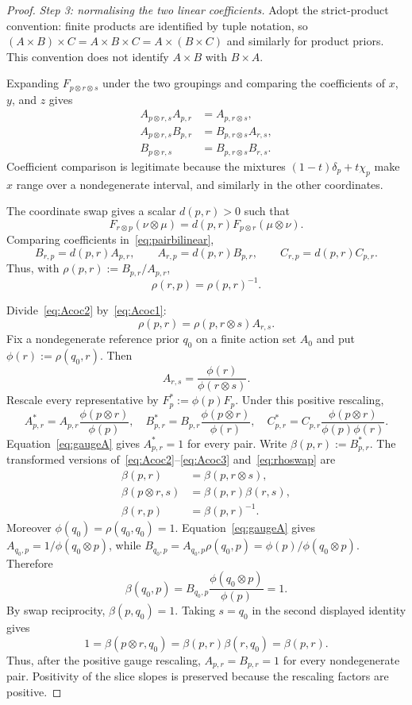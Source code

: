 \documentclass[11pt,a4paper]{article}
\theoremstyle{definition}
\newcommand{\1}{\mathbf 1}
\begin{document}
\begin{proof}
\emph{Step 3: normalising the two linear coefficients.}
Adopt the strict-product convention: finite products are identified by tuple notation, so
$(A\times B)\times C=A\times B\times C=A\times(B\times C)$ and similarly for product priors.  This convention does
not identify $A\times B$ with $B\times A$.

Expanding $F_{p\otimes r\otimes s}$ under the two groupings and comparing the coefficients of $x$, $y$, and $z$ gives
\begin{align}
A_{p\otimes r,s}A_{p,r}&=A_{p,r\otimes s}, \tag{C1}\label{eq:Acoc1}\\
A_{p\otimes r,s}B_{p,r}&=B_{p,r\otimes s}A_{r,s}, \tag{C2}\label{eq:Acoc2}\\
B_{p\otimes r,s}&=B_{p,r\otimes s}B_{r,s}. \tag{C3}\label{eq:Acoc3}
\end{align}
Coefficient comparison is legitimate because the mixtures $(1-t)\delta_p+t\chi_p$ make $x$ range over a nondegenerate
interval, and similarly in the other coordinates.

The coordinate swap gives a scalar $d(p,r)>0$ such that
\[
F_{r\otimes p}(\nu\otimes\mu)=d(p,r)F_{p\otimes r}(\mu\otimes\nu).
\]
Comparing coefficients in~\eqref{eq:pairbilinear},
\[
B_{r,p}=d(p,r)A_{p,r},
\qquad
A_{r,p}=d(p,r)B_{p,r},
\qquad
C_{r,p}=d(p,r)C_{p,r}.
\]
Thus, with $\rho(p,r):=B_{p,r}/A_{p,r}$,
\begin{equation}
\rho(r,p)=\rho(p,r)^{-1}.
\tag{SW}\label{eq:rhoswap}
\end{equation}

Divide~\eqref{eq:Acoc2} by~\eqref{eq:Acoc1}:
\[
\rho(p,r)=\rho(p,r\otimes s)A_{r,s}.
\]
Fix a nondegenerate reference prior $q_0$ on a finite action set $A_0$ and put $\phi(r):=\rho(q_0,r)$.  Then
\begin{equation}
A_{r,s}=\frac{\phi(r)}{\phi(r\otimes s)}.
\tag{G}\label{eq:gaugeA}
\end{equation}
Rescale every representative by $F_p^*:=\phi(p)F_p$.  Under this positive rescaling,
\[
A^*_{p,r}=A_{p,r}\frac{\phi(p\otimes r)}{\phi(p)},
\quad
B^*_{p,r}=B_{p,r}\frac{\phi(p\otimes r)}{\phi(r)},
\quad
C^*_{p,r}=C_{p,r}\frac{\phi(p\otimes r)}{\phi(p)\phi(r)}.
\]
Equation~\eqref{eq:gaugeA} gives $A^*_{p,r}=1$ for every pair.  Write $\beta(p,r):=B^*_{p,r}$.  The transformed
versions of~\eqref{eq:Acoc2}--\eqref{eq:Acoc3} and~\eqref{eq:rhoswap} are
\begin{align*}
\beta(p,r)&=\beta(p,r\otimes s),\\
\beta(p\otimes r,s)&=\beta(p,r)\beta(r,s),\\
\beta(r,p)&=\beta(p,r)^{-1}.
\end{align*}
Moreover $\phi(q_0)=\rho(q_0,q_0)=1$.  Equation~\eqref{eq:gaugeA} gives
$A_{q_0,p}=1/\phi(q_0\otimes p)$, while
$B_{q_0,p}=A_{q_0,p}\rho(q_0,p)=\phi(p)/\phi(q_0\otimes p)$.  Therefore
\[
\beta(q_0,p)=B_{q_0,p}\frac{\phi(q_0\otimes p)}{\phi(p)}=1.
\]
By swap reciprocity, $\beta(p,q_0)=1$.  Taking $s=q_0$ in the second displayed identity gives
\[
1=\beta(p\otimes r,q_0)=\beta(p,r)\beta(r,q_0)=\beta(p,r).
\]
Thus, after the positive gauge rescaling, $A_{p,r}=B_{p,r}=1$ for every nondegenerate pair.  Positivity of the slice
slopes is preserved because the rescaling factors are positive.


\end{proof}
\end{document}
